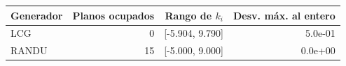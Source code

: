\begin{tabular}{lrrr}
\toprule
Generador & Planos ocupados & Rango de $k_i$ & Desv. máx. al entero \\
\midrule
LCG & 0 & [-5.904, 9.790] & 5.0e-01 \\
RANDU & 15 & [-5.000, 9.000] & 0.0e+00 \\
\bottomrule
\end{tabular}
